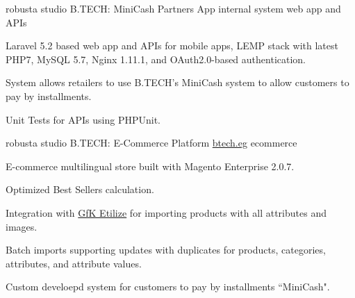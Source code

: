 


\begin{cventries}

  \cventry
    {robusta studio} %
    {B.TECH: MiniCash Partners App} %
    {internal system} %
    {web app and APIs} %
    {
      \begin{cvitems} %
        \item {Laravel 5.2 based web app and APIs for mobile apps, LEMP stack with latest PHP7, MySQL 5.7, Nginx 1.11.1, and OAuth2.0-based authentication.}
        \item {System allows retailers to use B.TECH's MiniCash system to allow customers to pay by installments.}
        \item {Unit Tests for APIs using PHPUnit.}
      \end{cvitems}
    }


  \cventry
    {robusta studio} %
    {B.TECH: E-Commerce Platform} %
    {\href{http://www.btech.eg} {btech.eg}} %
    {ecommerce} %
    {
      \begin{cvitems} %
        \item {E-commerce multilingual store built with Magento Enterprise 2.0.7.}
        \item {Optimized Best Sellers calculation.}
        \item {Integration with \href{http://www.etilize.com} {GfK Etilize} for importing products with all attributes and images.}
        \item {Batch imports supporting updates with duplicates for products, categories, attributes, and attribute values.}
        \item {Custom develoepd system for customers to pay by installments ``MiniCash".}
      \end{cvitems}
    }



\end{cventries}
